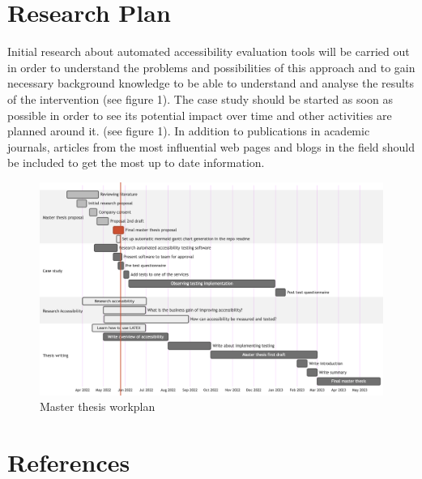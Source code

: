 \documentclass{thesis_proposal}
\begin{document}
\section{Research Plan}
Initial research about automated accessibility evaluation tools will be carried out in order to understand the problems and possibilities of this approach and to gain necessary background knowledge to be able to understand and analyse the results of the intervention (see figure 1).
The case study should be started as soon as possible in order to see its potential impact over time and other activities are planned around it.  (see figure 1).
In addition to publications in academic journals, articles from the most influential web pages and blogs in the field should be included to get the most up to date information.

\begin{figure}[ht!]
    \includegraphics[width=1\textwidth]{img/timeline.png}
    \caption{Master thesis workplan}
\end{figure}

\section{References}
\end{document}
